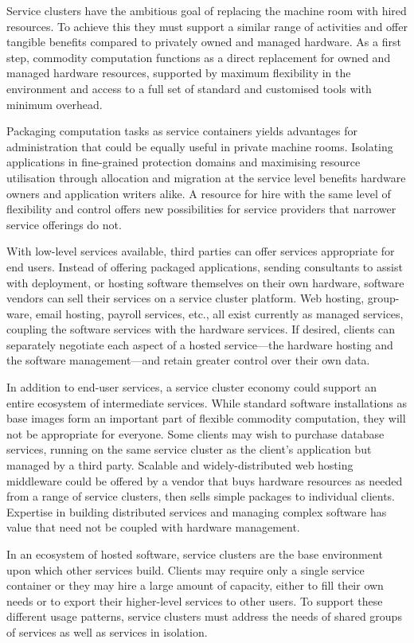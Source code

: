 Service clusters have the ambitious goal of replacing the machine room with hired resources. To achieve this they must support a similar range of activities and offer tangible benefits compared to privately owned and managed hardware. As a first step, commodity computation functions as a direct replacement for owned and managed hardware resources, supported by maximum flexibility in the environment and access to a full set of standard and customised tools with minimum overhead.

Packaging computation tasks as service containers yields advantages for administration that could be equally useful in private machine rooms. Isolating applications in fine-grained protection domains and maximising resource utilisation through allocation and migration at the service level benefits hardware owners and application writers alike. A resource for hire with the same level of flexibility and control offers new possibilities for service providers that narrower service offerings do not.

With low-level services available, third parties can offer services appropriate for end users. Instead of offering packaged applications, sending consultants to assist with deployment, or hosting software themselves on their own hardware, software vendors can sell their services on a service cluster platform. Web hosting, group-ware, email hosting, payroll services, etc., all exist currently as managed services, coupling the software services with the hardware services. If desired, clients can separately negotiate each aspect of a hosted service---the hardware hosting and the software management---and retain greater control over their own data.

In addition to end-user services, a service cluster economy could support an entire ecosystem of intermediate services. While standard software installations as base images form an important part of flexible commodity computation, they will not be appropriate for everyone. Some clients may wish to purchase database services, running on the same service cluster as the client's application but managed by a third party. Scalable and widely-distributed web hosting middleware could be offered by a vendor that buys hardware resources as needed from a range of service clusters, then sells simple packages to individual clients. Expertise in building distributed services and managing complex software has value that need not be coupled with hardware management.

In an ecosystem of hosted software, service clusters are the base environment upon which other services build. Clients may require only a single service container or they may hire a large amount of capacity, either to fill their own needs or to export their higher-level services to other users. To support these different usage patterns, service clusters must address the needs of shared groups of services as well as services in isolation.

